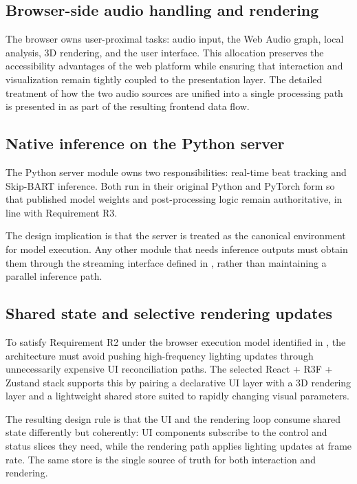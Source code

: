 \subsection{Browser-side audio handling and rendering}
\label{sec:ch4-browser-audio-rendering}

The browser owns user-proximal tasks: audio input, the Web Audio graph, local analysis, 3D rendering, and the user interface. This allocation preserves the accessibility advantages of the web platform while ensuring that interaction and visualization remain tightly coupled to the presentation layer. The detailed treatment of how the two audio sources are unified into a single processing path is presented in  as part of the resulting frontend data flow.

\subsection{Native inference on the Python server}
\label{sec:ch4-native-inference}

The Python server module owns two responsibilities: real-time beat tracking and Skip-BART inference. Both run in their original Python and PyTorch form so that published model weights and post-processing logic remain authoritative, in line with Requirement R3.

The design implication is that the server is treated as the canonical environment for model execution. Any other module that needs inference outputs must obtain them through the streaming interface defined in , rather than maintaining a parallel inference path.

\subsection{Shared state and selective rendering updates}
\label{sec:ch4-shared-state}

To satisfy Requirement R2 under the browser execution model identified in , the architecture must avoid pushing high-frequency lighting updates through unnecessarily expensive UI reconciliation paths. The selected React + R3F + Zustand stack supports this by pairing a declarative UI layer with a 3D rendering layer and a lightweight shared store suited to rapidly changing visual parameters.

The resulting design rule is that the UI and the rendering loop consume shared state differently but coherently: UI components subscribe to the control and status slices they need, while the rendering path applies lighting updates at frame rate. The same store is the single source of truth for both interaction and rendering.

